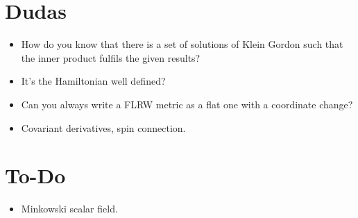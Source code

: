 \section{Dudas}
\begin{itemize}
	\item How do you know that there is a set of solutions of Klein Gordon such that the inner product fulfils the given results?
	\item It's the Hamiltonian well defined?
	\item Can you always write a FLRW metric as a flat one with a coordinate change?
	\item Covariant derivatives, spin connection.
\end{itemize}
\section{To-Do}
\begin{itemize}
	\item Minkowski scalar field.
\end{itemize}